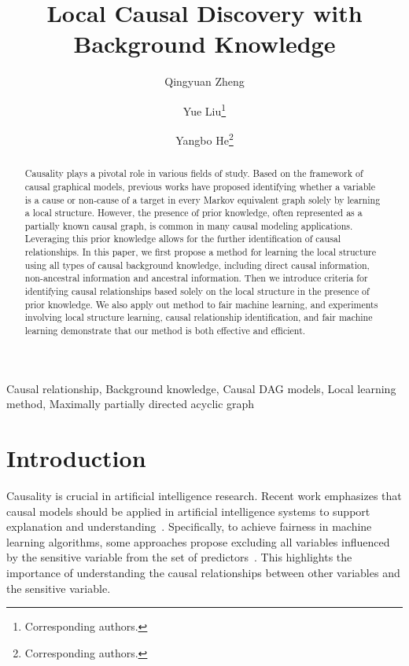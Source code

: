 \documentclass{article}
\newcommand{\sep}{, }
\begin{document}
\title{Local Causal Discovery with Background Knowledge}


\author[1]{Qingyuan Zheng}
\author[2]{Yue Liu\thanks{Corresponding authors.}}
\author[1]{Yangbo He\thanks{Corresponding authors.}}


\date{}
\maketitle

\begin{abstract}
Causality plays a pivotal role in various fields of study. Based on the framework of causal graphical models, previous works have proposed identifying whether a variable is a cause or non-cause of a target in every Markov equivalent graph solely by learning a local structure. However, the presence of prior knowledge, often represented as a partially known causal graph, is common in many causal modeling applications. Leveraging this prior knowledge allows for the further identification of causal relationships. In this paper, we first propose a method for learning the local structure using all types of causal background knowledge, including direct causal information, non-ancestral information and ancestral information. Then we introduce criteria for identifying causal relationships based solely on the local structure in the presence of prior knowledge. We also apply out method to fair machine learning, and experiments involving local structure learning, causal relationship identification, and fair machine learning demonstrate that our method is both effective and efficient.
\end{abstract}

\begin{keywords}
Causal relationship\sep Background knowledge\sep Causal DAG models\sep Local learning method\sep Maximally partially directed acyclic graph
\end{keywords}


\section{Introduction}
\label{sec:intro}
Causality is crucial in artificial intelligence research. 
Recent work emphasizes that causal models should be applied in artificial intelligence systems to support explanation and understanding~\citep{lake2017building}. 
Specifically, to achieve fairness in machine learning algorithms, some approaches propose excluding all variables influenced by the sensitive variable from the set of predictors~\citep{wu2019counterfactual, zuo2022counterfactual}.
This highlights the importance of understanding the causal relationships between other variables and the sensitive variable. 
\end{document}

